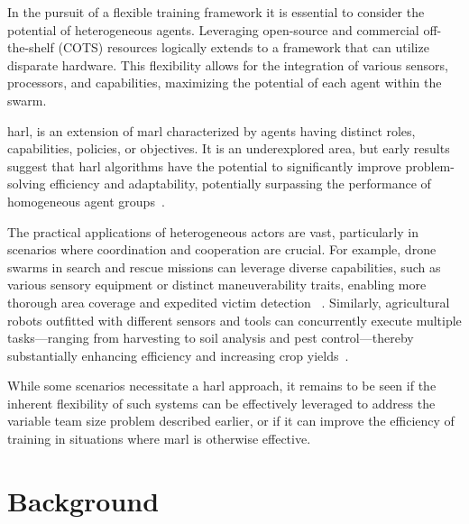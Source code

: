 In the pursuit of a flexible training framework
it is essential to consider the potential of heterogeneous agents. 
Leveraging open-source and commercial off-the-shelf (COTS) resources 
logically extends to a framework that can utilize disparate hardware. 
This flexibility allows for the integration of various sensors, processors, 
and capabilities, maximizing the potential of each agent within the swarm. 

\Gls{harl}, is an extension of \gls{marl} characterized by agents having 
distinct roles, capabilities, policies, or objectives. It is an 
underexplored area, but early results suggest that \gls{harl} algorithms
have the potential to significantly improve problem-solving efficiency 
and adaptability, potentially surpassing the performance of homogeneous agent 
groups~\cite{calvo2018}.

The practical applications of heterogeneous actors are vast, particularly in 
scenarios where coordination and cooperation are crucial. For example, 
drone swarms in search and rescue missions can leverage diverse capabilities, 
such as various sensory equipment or distinct maneuverability traits, 
enabling more thorough area coverage and expedited victim detection
~\cite{hoang2023,kouzeghar2023}.
Similarly, agricultural robots outfitted with different sensors and tools can 
concurrently execute multiple tasks—ranging from harvesting to soil analysis and
pest control—thereby substantially enhancing efficiency and increasing crop 
yields~\cite{carbone2018,amarasinghe2019}.

While some scenarios necessitate a \gls{harl} approach, it remains to 
be seen if the inherent flexibility of such systems can be effectively 
leveraged to address the variable team size problem described earlier, 
or if it can improve the efficiency of training in situations where 
\gls{marl} is otherwise effective.


\section{Background}%
\label{sec:background}

